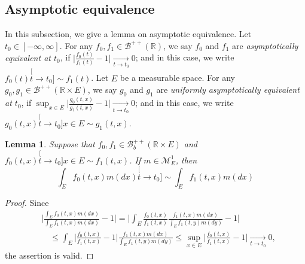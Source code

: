 \documentclass[12pt, a4paper]{amsart}
\newtheorem{lem}[thm]{Lemma}
\theoremstyle{definition}
\numberwithin{equation}{section}
\begin{document}
\subsection{Asymptotic equivalence}
\label{sec: Asymptotic equivalence}
  In this subsection, 
we give a lemma on asymptotic equivalence.	
	Let $t_0 \in [-\infty,\infty]$.
	For any $f_0, f_1\in \mathscr B^{++}({\mathbb R})$, we say $f_0$ and $f_1$ are \emph{asymptotically equivalent at $t_0$}, if $\big|\frac{f_0(t)}{f_1(t)} - 1\big| \xrightarrow[t\to t_0]{} 0$;
	and in this case, we write $f_0(t) \stackrel[t\to t_0]{}{\sim} f_1(t)$.
	Let $E$ be a measurable space.
	For any $g_0, g_1\in \mathscr B^{++}({\mathbb R\times E})$, we say $g_0$ and $g_1$ are \emph{uniformly asymptotically equivalent at $t_0$}, if $\sup_{x\in E}\big|\frac{g_0(t,x)}{g_1(t,x)} - 1\big| \xrightarrow[t\to t_0]{} 0$; and in this case, we write $g_0(t,x)\stackrel[t\to t_0]{x\in E}{\sim}g_1(t,x)$.

\begin{lem}
\label{lem: asymptotic equivalent of integration}
	Suppose that $f_0,f_1\in \mathscr B^{++}_b({\mathbb R \times E})$ and $f_0(t,x)\stackrel[t\to t_0]{x\in E}{\sim}f_1(t,x)$.
	If $m \in \mathcal M^1_E$, then
\[
	\int_E f_0(t,x)m(dx)
	\stackrel[t\to t_0]{}{\sim}
	\int_E f_1(t,x)m(dx)
\]
\end{lem}
\begin{proof}
Since
\[\begin{split}
	&\Big| \frac{	\int_E f_0(t,x)m(dx) }{ 	\int_E f_1(t,x)m(dx)  } - 1 \Big|
	= \Big| \int_E \frac{f_0(t,x)}{f_1(t,x)} \frac{f_1(t,x)m(dx)}{	\int_E f_1(t,y)m(dy)  } - 1\Big|
	\\&\quad \leq \int_E \Big|  \frac{f_0(t,x)}{f_1(t,x)} - 1 \Big| \frac{f_1(t,x)m(dx)}{	\int_E f_1(t,y)m(dy)  }
	\leq \sup_{x\in E} \Big|  \frac{f_0(t,x)}{f_1(t,x)} - 1 \Big|
	\xrightarrow[t\to t_0]{} 0,
\end{split}\]
the assertion is valid.
\end{proof}
\end{document}
